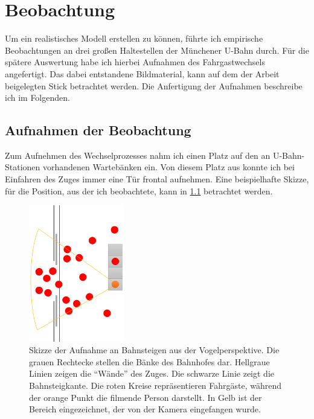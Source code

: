 \chapter{Beobachtung} \label{Beobachtung}
Um ein realistisches Modell erstellen zu können, führte ich empirische Beobachtungen an drei großen Haltestellen der Münchener U-Bahn durch. Für die spätere Auswertung habe ich hierbei Aufnahmen des Fahrgastwechsels angefertigt. Das dabei entstandene Bildmaterial, kann auf dem der Arbeit beigelegten Stick betrachtet werden. Die Anfertigung der Aufnahmen beschreibe ich im Folgenden. 
\section{Aufnahmen der Beobachtung} \label{Aufnahmedetails}
Zum Aufnehmen des Wechselprozesses nahm ich einen Platz auf den an U-Bahn-Stationen vorhandenen Wartebänken ein. Von diesem Platz aus konnte ich bei Einfahren des Zuges immer eine Tür frontal aufnehmen. Eine beispielhafte Skizze, für die Position, aus der ich beobachtete, kann in \figurename \ref{fig:skizzeBeobachtung} betrachtet werden. \\
\begin{figure}[H]
	\centering
		\includegraphics[angle=270, width=0.37\textwidth]{pictures/observation/recording/example_tapping.png}
	\caption{Skizze der Aufnahme an Bahnsteigen aus der Vogelperspektive. Die grauen Rechtecke stellen die Bänke des Bahnhofes dar. Hellgraue Linien zeigen die "`Wände"' des Zuges. Die schwarze Linie zeigt die Bahnsteigkante. Die roten Kreise repräsentieren Fahrgäste, während der orange Punkt die filmende Person darstellt. In Gelb ist der Bereich eingezeichnet, der von der Kamera eingefangen wurde.}
	\label{fig:skizzeBeobachtung}
\end{figure}
